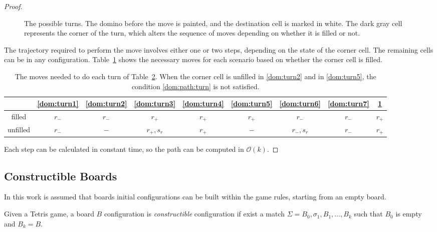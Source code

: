 \begin{proof}
\begin{figure}[h]
\begin{subfigure}[b]{0.1\textwidth}
    \caption{\label{dom:turn8}}
  \end{subfigure}
    \caption{The possible turns. The domino before the move is painted, and the destination cell is marked in white. The dark gray cell represents the corner of the turn, which alters the sequence of moves depending on whether it is filled or not.} 
    \label{dom:turns} 
\end{figure}
The trajectory required to perform the move involves either one or two steps, depending on the state of the corner cell. The remaining cells can be in any configuration. Table~\ref{dom:turns-table} shows the necessary moves for each scenario based on whether the corner cell is filled.

\begin{table}[ht]
\centering
\begin{tabular}{|c || c | c | c | c | c | c | c | c |} 
 \hline
  & \ref{dom:turn1} & \ref{dom:turn2} & \ref{dom:turn3} & \ref{dom:turn4} & \ref{dom:turn5} & \ref{dom:turn6} & \ref{dom:turn7} & \ref{dom:turn8} \\
 \hline               
  filled & $ r_-  $ & $      r_-    $ & $   r_+       $ & $   r_+       $ & $   r_+       $ & $     r_-     $ & $   r_-       $ & $   r_+      $  \\
 \hline               
unfilled & $ r_-  $ & $     -       $ & $   r_+, s_r  $ & $   r_+       $ & $    -        $ & $  r_-, s_r   $ & $   r_-       $ & $   r_+      $  \\
 \hline               

\end{tabular}
\caption{The moves needed to do each turn of Table~\ref{dom:turns}. When the corner cell is unfilled in \ref{dom:turn2} and in \ref{dom:turn5}, the condition \ref{dom:path:turn} is not satisfied. }
\label{dom:turns-table}
\end{table}

Each step can be calculated in constant time, so the path can be computed in $\mathcal{O}(k)$.

\end{proof}


\subsection{Constructible Boards}

In this work is assumed that boards initial configurations can be built within the game rules, starting from an empty board.  

\begin{definition}
  Given a Tetris game, a board $B$ configuration is \emph{constructible} configuration if exist a match $\Sigma = B_0, \sigma_1, B_1, \dots, B_k$ such that $B_0$ is empty and $B_k = B$. 
\end{definition}

